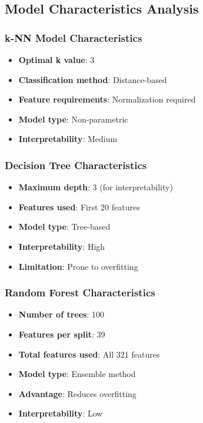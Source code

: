 \subsection{Model Characteristics Analysis}

\subsubsection{k-NN Model Characteristics}
\begin{itemize}
    \item \textbf{Optimal k value}: 3
    \item \textbf{Classification method}: Distance-based
    \item \textbf{Feature requirements}: Normalization required
    \item \textbf{Model type}: Non-parametric
    \item \textbf{Interpretability}: Medium
\end{itemize}

\subsubsection{Decision Tree Characteristics}
\begin{itemize}
    \item \textbf{Maximum depth}: 3 (for interpretability)
    \item \textbf{Features used}: First 20 features
    \item \textbf{Model type}: Tree-based
    \item \textbf{Interpretability}: High
    \item \textbf{Limitation}: Prone to overfitting
\end{itemize}

\subsubsection{Random Forest Characteristics}
\begin{itemize}
    \item \textbf{Number of trees}: 100
    \item \textbf{Features per split}: 39
    \item \textbf{Total features used}: All 321 features
    \item \textbf{Model type}: Ensemble method
    \item \textbf{Advantage}: Reduces overfitting
    \item \textbf{Interpretability}: Low
\end{itemize}


